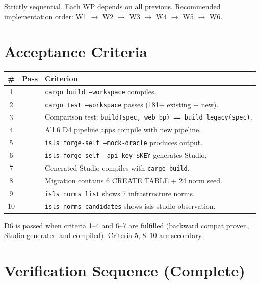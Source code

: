 \documentclass[11pt,a4paper]{article}
\begin{document}
Strictly sequential. Each WP depends on all previous.
Recommended implementation order: W1 $\to$ W2 $\to$ W3 $\to$ W4 
$\to$ W5 $\to$ W6.


\section{Acceptance Criteria}

\begin{longtable}{clp{9cm}}
\toprule
\textbf{\#} & \textbf{Pass} & \textbf{Criterion} \\
\midrule
1 & & \texttt{cargo build --workspace} compiles. \\
2 & & \texttt{cargo test --workspace} passes (181+ existing + new). \\
3 & & Comparison test: \texttt{build(spec, web\_bp) == build\_legacy(spec)}.\\
4 & & All 6 D4 pipeline apps compile with new pipeline. \\
5 & & \texttt{isls forge-self --mock-oracle} produces output. \\
6 & & \texttt{isls forge-self --api-key \$KEY} generates Studio. \\
7 & & Generated Studio compiles with \texttt{cargo build}. \\
8 & & Migration contains 6 CREATE TABLE + 24 norm seed. \\
9 & & \texttt{isls norms list} shows 7 infrastructure norms. \\
10 & & \texttt{isls norms candidates} shows isls-studio observation. \\
\bottomrule
\end{longtable}

D6 is passed when criteria 1--4 and 6--7 are fulfilled (backward 
compat proven, Studio generated and compiled). Criteria 5, 8--10 
are secondary.


\section{Verification Sequence (Complete)}
\end{document}
